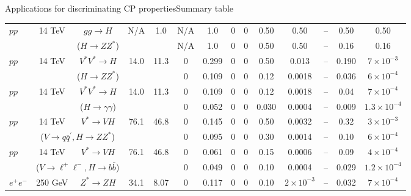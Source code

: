 \documentclass[usenames,dvipsnames,svgnames,table]{beamer}
\begin{document}
\begin{frame}{Applications for discriminating CP properties}{Summary table}
{\begin{tabular}{|lcccc || cccccc || cccc |}
\hline
\hline
$pp$ & 14 TeV &  $gg\to H$                        & N/A        &  1.0       &   N/A & 1.0 &  0 & 0 & 0.50 & 0.50 & \multicolumn{2}{c}{ --  } &  0.50 & 0.50 \\
          &               &   ($H\to ZZ^*$)              &            &               &  N/A & 1.0 &  0 & 0  & 0.50 & 0.50 & \multicolumn{2}{c}{ --  } & 0.16 & 0.16 \\
\hline
$pp$ & 14 TeV &  $V^*V^*\to H$                & 14.0     &  11.3    &  0 & 0.299      &  0 & 0 & 0.50 & 0.013  & \multicolumn{2}{c}{ --  } & 0.190 &$7\!\times\!10^{-3}$ \\
          &               &   ($H\to ZZ^*$)                &            &              &   0 & 0.109 &  0 & 0  & 0.12 & 0.0018 & \multicolumn{2}{c}{ --  } & 0.036 & $6\!\times\!10^{-4}$ \\
\hline
$pp$ & 14 TeV &  $V^*V^*\to H$                            & 14.0     &  11.3       & 0 & 0.109 &  0 & 0  & 0.12 & 0.0018 & \multicolumn{2}{c}{ --  }  & 0.04 & $7\!\times\!10^{-4}$  \\
          &               &   ($H\to\gamma\gamma$)             &           &                & 0 & 0.052 &  0 & 0  & 0.030 & 0.0004 & \multicolumn{2}{c}{ --  } &  0.009 & $1.3\!\times\!10^{-4}$\\
\hline
$pp$ & 14 TeV &  $V^*\to VH$                    &  76.1     &  46.8      & 0 & 0.145   & 0 & 0  & 0.50 & 0.0032  & \multicolumn{2}{c}{ --  }  & 0.32 & $3\!\times\!10^{-3}$  \\
          &              \multicolumn{2}{c}{($V\to q\bar{q}^\prime, H\to ZZ^*$)}
                                                                            &           &                & 0  & 0.095      &  0 & 0  & 0.30 & 0.0014 & \multicolumn{2}{c}{ --  } & 0.10 & $6\!\times\!10^{-4}$  \\
\hline
%
$pp$ & 14 TeV &  $V^*\to VH$                                                                   &  76.1   &  46.8      & 0 & 0.061 & 0 & 0  & 0.15 & 0.0006 & \multicolumn{2}{c}{ --  }  & 0.09  & $4\!\times\!10^{-4}$  \\
         &            \multicolumn{2}{c}{($V\to \ell^+\ell^-, H\to b\bar{b}$)}   &           &                 &  0 & 0.049 &  0 & 0  & 0.10 &  0.0004 & \multicolumn{2}{c}{ --  } & 0.029 & $1.2\!\times\!10^{-4}$  \\
\hline\hline
$e^+e^-$ & 250 GeV & $Z^*\to ZH$ & 34.1 &  8.07 & 0  & 0.117 & 0 & 0  & 0.10 & $2\times10^{-3}$ & \multicolumn{2}{c}{ --  } & 0.032 & $7\!\times\!10^{-4}$ \\

\end{tabular}}
\end{frame}
\end{document}
